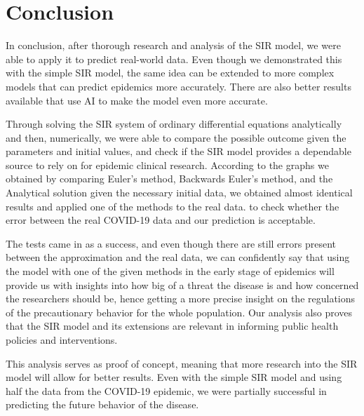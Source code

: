 


\section{Conclusion}\label{Conclusion}\thispagestyle{SectionFirstPage}

\hspace{\parindent} In conclusion, after thorough research and analysis of the SIR model, we were able to apply it to predict real-world data.
Even though we demonstrated this with the simple SIR model, the same idea can be extended to more complex models that can predict epidemics more accurately.
There are also better results available that use AI to make the model even more accurate.
\par Through solving the SIR system of ordinary differential equations analytically and then, numerically, we were able to compare the possible outcome given the
parameters and initial values, and check if the SIR model provides a dependable source to rely on for epidemic clinical research.
According to the graphs we obtained by comparing Euler's method, Backwards Euler's method, and the Analytical solution given the necessary initial data, we obtained almost identical results and applied one of the methods to the real data.
to check whether the error between the real COVID-19 data and our prediction is acceptable.
\par The tests came in as a success, and even though there are still errors present between the approximation and the real data, we can confidently say that using the model
with one of the given methods in the early stage of epidemics will provide us with insights into how big of a threat
the disease is and how concerned the researchers should be, hence getting a more precise insight on
the regulations of the precautionary behavior for the whole population.
Our analysis also proves that the SIR model and its extensions are relevant in informing public health policies and interventions.
\par This analysis serves as proof of concept, meaning that more research into the SIR model will allow for better results.
Even with the simple SIR model and using half the data from the COVID-19 epidemic, we were partially successful in predicting the future behavior of the disease.